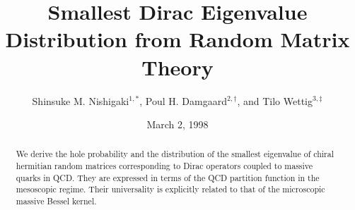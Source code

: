 \renewcommand{\narrowtext}{\begin{multicols}{2} \global\columnwidth20.5pc}
\renewcommand{\widetext}{\end{multicols} \global\columnwidth42.5pc}
\newcommand{\Lrule}{\vspace*{-0.2in}\noindent\vrule width3.5in height.2pt
  depth.2pt \vrule depth0em height1em}
\newcommand{\Rrule}{\vspace{-0.1in}\hfill\vrule depth1em height0pt \vrule
  width3.5in height.2pt depth.2pt\vspace*{-0.1in}}
\def\beq{\begin{equation}}
\def\eeq{\end{equation}}
\def\bea{\begin{eqnarray}}
\def\eea{\end{eqnarray}}
\def\to{\rightarrow}
\def\e{{\rm e}}
\def\tr{{\rm tr}}
\def\la{\lambda}
\def\a{\alpha}

\draft
\title{ 
Smallest Dirac Eigenvalue Distribution from Random Matrix Theory
}
\author{
Shinsuke M. Nishigaki$^{1,*}$,
Poul H. Damgaard$^{2,\dagger}$, and
Tilo Wettig$^{3,\ddagger}$}
\address{
${}^1$Institute for Theoretical Physics, University of California,
Santa Barbara, CA 93106-4030, USA}
\address{
${}^2$The Niels Bohr Institute, Blegdamsvej 17, DK-2100 Copenhagen \O,
Denmark}
\address{
${}^3$Institut f\"{u}r Theoretische Physik, Technische Universit\"{a}t
M\"{u}nchen, D-85747 Garching, Germany}
\date{March 2, 1998}
\maketitle
\begin{abstract} 
We derive the hole probability and the distribution of the smallest 
eigenvalue of chiral hermitian random matrices corresponding to  
Dirac operators coupled to massive quarks in QCD.
They are expressed in terms of the QCD partition function in the
mesoscopic regime. 
Their universality is explicitly related to that of the microscopic
massive Bessel kernel.
\end{abstract}

